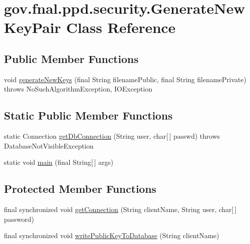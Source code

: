 \hypertarget{classgov_1_1fnal_1_1ppd_1_1security_1_1GenerateNewKeyPair}{\section{gov.\-fnal.\-ppd.\-security.\-Generate\-New\-Key\-Pair Class Reference}
\label{classgov_1_1fnal_1_1ppd_1_1security_1_1GenerateNewKeyPair}
}
\subsection*{Public Member Functions}
\begin{DoxyCompactItemize}
\item 
void \hyperlink{classgov_1_1fnal_1_1ppd_1_1security_1_1GenerateNewKeyPair_a8fd10e2d562feed30edd515a65c65935}{generate\-New\-Keys} (final String filename\-Public, final String filename\-Private)  throws No\-Such\-Algorithm\-Exception, I\-O\-Exception 
\end{DoxyCompactItemize}
\subsection*{Static Public Member Functions}
\begin{DoxyCompactItemize}
\item 
static Connection \hyperlink{classgov_1_1fnal_1_1ppd_1_1security_1_1GenerateNewKeyPair_aee008581c8b456ffcdc83a6396e773eb}{get\-Db\-Connection} (String user, char\mbox{[}$\,$\mbox{]} passwd)  throws Database\-Not\-Visible\-Exception 
\item 
static void \hyperlink{classgov_1_1fnal_1_1ppd_1_1security_1_1GenerateNewKeyPair_afe479a0827a3f54f723f59eda57ae050}{main} (final String\mbox{[}$\,$\mbox{]} args)
\end{DoxyCompactItemize}
\subsection*{Protected Member Functions}
\begin{DoxyCompactItemize}
\item 
final synchronized void \hyperlink{classgov_1_1fnal_1_1ppd_1_1security_1_1GenerateNewKeyPair_a5848fc4da11044885fe5baf92e88a0c4}{get\-Connection} (String client\-Name, String user, char\mbox{[}$\,$\mbox{]} password)
\item 
final synchronized void \hyperlink{classgov_1_1fnal_1_1ppd_1_1security_1_1GenerateNewKeyPair_a0df582e5aa3c2c81e890760384247b3d}{write\-Public\-Key\-To\-Database} (String client\-Name)
\end{DoxyCompactItemize}


